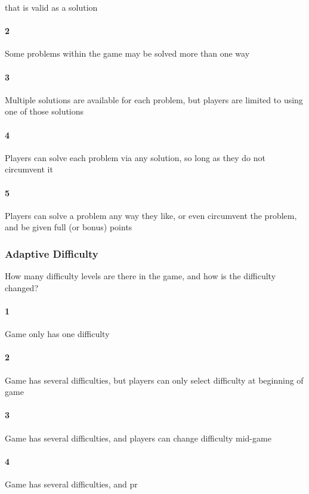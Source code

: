  that is valid as a solution\paragraph{2}Some problems within the game may be solved more than one way\paragraph{3}Multiple solutions are available for each problem, but players are limited to using one of those solutions\paragraph{4}Players can solve each problem via any solution, so long as they do not circumvent it\paragraph{5}Players can solve a problem any way they like, or even circumvent the problem, and be given full (or bonus) points\subsubsection{Adaptive Difficulty}How many difficulty levels are there in the game, and how is the difficulty changed?\paragraph{1}Game only has one difficulty\paragraph{2}Game has several difficulties, but players can only select difficulty at beginning of game\paragraph{3}Game has several difficulties, and players can change difficulty mid-game\paragraph{4}Game has several difficulties, and pr